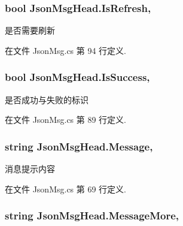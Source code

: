 \hypertarget{class_json_msg_head_a2f7ab4b4950d59559dc61dbe85ab6e83}{
\subsubsection[{Is\-Refresh}]{\setlength{\rightskip}{0pt plus 5cm}bool Json\-Msg\-Head.\-Is\-Refresh\hspace{0.3cm}{\ttfamily [get]}, {\ttfamily [set]}}}\label{class_json_msg_head_a2f7ab4b4950d59559dc61dbe85ab6e83}


是否需要刷新 



在文件 Json\-Msg.\-cs 第 94 行定义.

\hypertarget{class_json_msg_head_ae469a6cdc43ba8a305f1ea0f738fefb2}{
\subsubsection[{Is\-Success}]{\setlength{\rightskip}{0pt plus 5cm}bool Json\-Msg\-Head.\-Is\-Success\hspace{0.3cm}{\ttfamily [get]}, {\ttfamily [set]}}}\label{class_json_msg_head_ae469a6cdc43ba8a305f1ea0f738fefb2}


是否成功与失败的标识 



在文件 Json\-Msg.\-cs 第 89 行定义.

\hypertarget{class_json_msg_head_a383ce85bc63ef51d4efb9c6f16324d39}{
\subsubsection[{Message}]{\setlength{\rightskip}{0pt plus 5cm}string Json\-Msg\-Head.\-Message\hspace{0.3cm}{\ttfamily [get]}, {\ttfamily [set]}}}\label{class_json_msg_head_a383ce85bc63ef51d4efb9c6f16324d39}


消息提示内容 



在文件 Json\-Msg.\-cs 第 69 行定义.

\hypertarget{class_json_msg_head_a2119772449e6dfa14eb675b3c79a40bb}{
\subsubsection[{Message\-More}]{\setlength{\rightskip}{0pt plus 5cm}string Json\-Msg\-Head.\-Message\-More\hspace{0.3cm}{\ttfamily [get]}, {\ttfamily [set]}}}\label{class_json_msg_head_a2119772449e6dfa14eb675b3c79a40bb}


